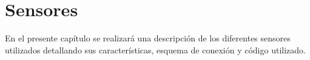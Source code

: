 

\newpage


\chapter{Sensores}

\label{chap:sensores}

En el presente capítulo se realizará una descripción de los diferentes sensores utilizados detallando sus características, esquema de conexión y código utilizado.\\




